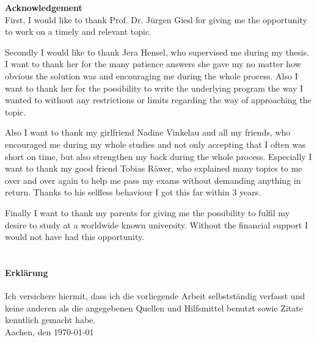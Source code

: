{\bf\Large Acknowledgement} \\ [1em] 

First, I would like to thank Prof. Dr. Jürgen Giesl for giving me the opportunity to work on a timely and relevant topic.

Secondly I would like to thank Jera Hensel, who supervised me during my thesis. I want to thank her for the many patience answers she gave my no matter how obvious the solution was and encouraging me during the whole process. Also I want to thank her for the possibility to write the underlying program the way I wanted to without any restrictions or limits regarding the way of approaching the topic. 

Also I want to thank my girlfriend Nadine Vinkelau and all my friends, who encouraged me during my whole studies and not only accepting that I often was short on time, but also strengthen my back during the whole process. Especially I want to thank my good friend Tobias Räwer, who explained many topics to me over and over again to help me pass my exams without demanding anything in return. Thanks to his selfless behaviour I got this far within 3 years.

Finally I want to thank my parents for giving me the possibility to fulfil my desire to study at a worldwide known university. Without the financial support I would not have had this opportunity. \\ \\

\paragraph{Erklärung} Ich versichere hiermit, dass ich die vorliegende Arbeit selbstständig verfasst und keine
anderen als die angegebenen Quellen und Hilfsmittel benutzt sowie Zitate kenntlich
gemacht habe.\newline \\
Aachen, den \today

